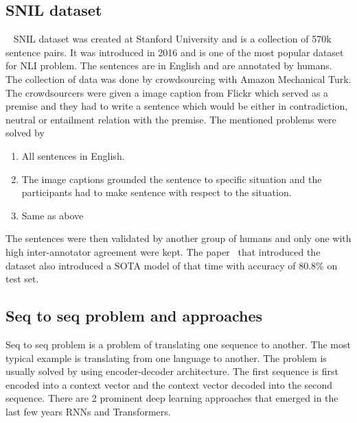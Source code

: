 \documentclass{article}
\begin{document}
    \subsection{SNIL dataset}~\cite{StanfordNaturalLanguage}
    SNIL dataset was created at Stanford University and is a collection of 570k sentence pairs.
    It was introduced in 2016 and is one of the most popular dataset for NLI problem.
    The sentences are in English and are annotated by humans. The collection of data was done by crowdsourcing with Amazon Mechanical Turk.
    The crowdsourcers were given a image caption from Flickr which served as a premise and they had to write a sentence which would be either in contradiction, neutral or entailment relation with the premise.
    The mentioned problems were solved by
    \begin{enumerate}
        \item All sentences in English.
        \item The image captions grounded the sentence to specific situation and the participants had to make sentence with respect to the situation.
        \item Same as above
    \end{enumerate}
    The sentences were then validated by another group of humans and only one with high inter-annotator agreement were kept.
    The paper~\cite{StanfordNaturalLanguage} that introduced the dataset also introduced a SOTA model of that time with accuracy of 80.8\% on test set.
    \subsection{Seq to seq problem and approaches}
    Seq to seq problem is a problem of translating one sequence to another. The most typical example is translating from one language to another.
    The problem is usually solved by using encoder-decoder architecture. The first sequence is first encoded into a context vector and the context vector decoded into the second sequence.
    There are 2 prominent deep learning approaches that emerged in the last few years RNNs and Transformers.
\end{document}
